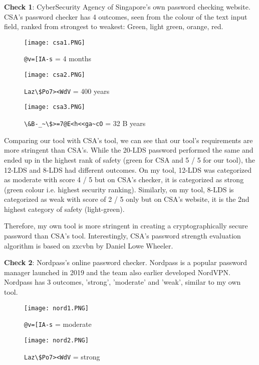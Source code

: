 \documentclass[letterpaper,twocolumn,10pt]{article}
\begin{document}
\textbf{Check 1}: CyberSecurity Agency of Singapore's own password checking website\cite{csa}. CSA's password checker has 4 outcomes, seen from the colour of the text input field, ranked from strongest to weakest: Green, light green, orange, red.

\begin{figure}[H]
    \centering
    \texttt{[image: csa1.PNG]}
    \caption{\lstinline{@v=[IA-s} = 4 months}
\end{figure}

\begin{figure}[H]
    \centering
    \texttt{[image: csa2.PNG]}
    \caption{\lstinline{Laz\$Po7><WdV} = 400 years}
\end{figure}

\begin{figure}[H]
    \centering
    \texttt{[image: csa3.PNG]}
    \caption{\lstinline{\&B-_~\$>=7@E<h<<ga~cO} = 32 B years}
\end{figure}

Comparing our tool with CSA's tool, we can see that our tool's requirements are more stringent than CSA's. While the 20-LDS password performed the same and ended up in the highest rank of safety (green for CSA and 5 / 5 for our tool), the 12-LDS and 8-LDS had different outcomes. On my tool, 12-LDS was categorized as moderate with score 4 / 5 but on CSA's checker, it is categorized as strong (green colour i.e. highest security ranking). Similarly, on my tool, 8-LDS is categorized as weak with score of 2 / 5 only but on CSA's website, it is the 2nd highest category of safety (light-green). 

Therefore, my own tool is more stringent in creating a cryptographically secure password than CSA's tool. Interestingly, CSA's password strength evaluation algorithm is based on zxcvbn by Daniel Lowe Wheeler.

\textbf{Check 2}: Nordpass's online password checker\cite{nordpass}. Nordpass is a popular password manager launched in 2019 and the team also earlier developed NordVPN. Nordpass has 3 outcomes, 'strong', 'moderate' and 'weak', similar to my own tool.

\begin{figure}[H]
    \centering
    \texttt{[image: nord1.PNG]}
    \caption{\lstinline{@v=[IA-s} = moderate}
\end{figure}

\begin{figure}[H]
    \centering
    \texttt{[image: nord2.PNG]}
    \caption{\lstinline{Laz\$Po7><WdV} = strong}
\end{figure}
\end{document}
